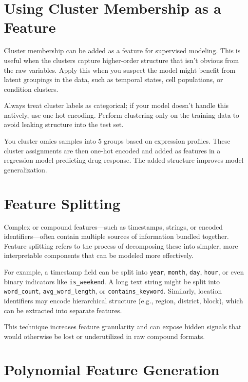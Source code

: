 \documentclass[12pt,openany, draft]{book}
\begin{document}
\section{Using Cluster Membership as a Feature}

Cluster membership can be added as a feature for supervised modeling. This is useful when the clusters capture higher-order structure that isn't obvious from the raw variables. Apply this when you suspect the model might benefit from latent groupings in the data, such as temporal states, cell populations, or condition clusters.

Always treat cluster labels as categorical; if your model doesn’t handle this natively, use one-hot encoding. Perform clustering only on the training data to avoid leaking structure into the test set.

\begin{examplebox}
You cluster omics samples into 5 groups based on expression profiles. These cluster assignments are then one-hot encoded and added as features in a regression model predicting drug response. The added structure improves model generalization.
\end{examplebox}



\section{Feature Splitting}

Complex or compound features—such as timestamps, strings, or encoded identifiers—often contain multiple sources of information bundled together. Feature splitting refers to the process of decomposing these into simpler, more interpretable components that can be modeled more effectively.

For example, a timestamp field can be split into \texttt{year}, \texttt{month}, \texttt{day}, \texttt{hour}, or even binary indicators like \texttt{is\_weekend}. A long text string might be split into \texttt{word\_count}, \texttt{avg\_word\_length}, or \texttt{contains\_keyword}. Similarly, location identifiers may encode hierarchical structure (e.g., region, district, block), which can be extracted into separate features.

This technique increases feature granularity and can expose hidden signals that would otherwise be lost or underutilized in raw compound formats.



\section{Polynomial Feature Generation}
\end{document}

